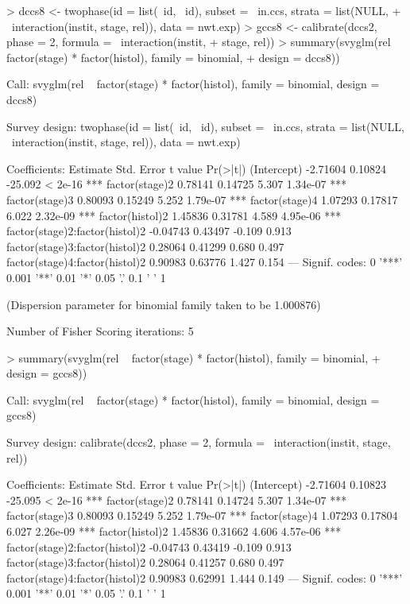 \documentclass{article}
\begin{document}
\begin{Schunk}
\begin{Sinput}
> dccs8 <- twophase(id = list(~id, ~id), subset = ~in.ccs, strata = list(NULL, 
+     ~interaction(instit, stage, rel)), data = nwt.exp)
> gccs8 <- calibrate(dccs2, phase = 2, formula = ~interaction(instit, 
+     stage, rel))
> summary(svyglm(rel ~ factor(stage) * factor(histol), family = binomial, 
+     design = dccs8))
\end{Sinput}
\begin{Soutput}
Call:
svyglm(rel ~ factor(stage) * factor(histol), family = binomial, 
    design = dccs8)

Survey design:
twophase(id = list(~id, ~id), subset = ~in.ccs, strata = list(NULL, 
    ~interaction(instit, stage, rel)), data = nwt.exp)

Coefficients:
                               Estimate Std. Error t value Pr(>|t|)    
(Intercept)                    -2.71604    0.10824 -25.092  < 2e-16 ***
factor(stage)2                  0.78141    0.14725   5.307 1.34e-07 ***
factor(stage)3                  0.80093    0.15249   5.252 1.79e-07 ***
factor(stage)4                  1.07293    0.17817   6.022 2.32e-09 ***
factor(histol)2                 1.45836    0.31781   4.589 4.95e-06 ***
factor(stage)2:factor(histol)2 -0.04743    0.43497  -0.109    0.913    
factor(stage)3:factor(histol)2  0.28064    0.41299   0.680    0.497    
factor(stage)4:factor(histol)2  0.90983    0.63776   1.427    0.154    
---
Signif. codes:  0 '***' 0.001 '**' 0.01 '*' 0.05 '.' 0.1 ' ' 1 

(Dispersion parameter for binomial family taken to be 1.000876)

Number of Fisher Scoring iterations: 5
\end{Soutput}
\begin{Sinput}
> summary(svyglm(rel ~ factor(stage) * factor(histol), family = binomial, 
+     design = gccs8))
\end{Sinput}
\begin{Soutput}
Call:
svyglm(rel ~ factor(stage) * factor(histol), family = binomial, 
    design = gccs8)

Survey design:
calibrate(dccs2, phase = 2, formula = ~interaction(instit, stage, 
    rel))

Coefficients:
                               Estimate Std. Error t value Pr(>|t|)    
(Intercept)                    -2.71604    0.10823 -25.095  < 2e-16 ***
factor(stage)2                  0.78141    0.14724   5.307 1.34e-07 ***
factor(stage)3                  0.80093    0.15249   5.252 1.79e-07 ***
factor(stage)4                  1.07293    0.17804   6.027 2.26e-09 ***
factor(histol)2                 1.45836    0.31662   4.606 4.57e-06 ***
factor(stage)2:factor(histol)2 -0.04743    0.43419  -0.109    0.913    
factor(stage)3:factor(histol)2  0.28064    0.41257   0.680    0.497    
factor(stage)4:factor(histol)2  0.90983    0.62991   1.444    0.149    
---
Signif. codes:  0 '***' 0.001 '**' 0.01 '*' 0.05 '.' 0.1 ' ' 1 


\end{Soutput}
\end{Schunk}
\end{document}
